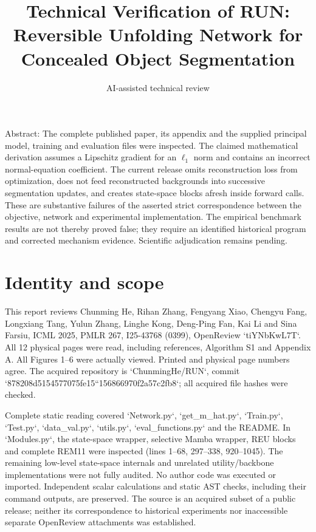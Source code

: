 \documentclass[10pt]{article}
\title{Technical Verification of RUN: Reversible Unfolding Network for Concealed Object Segmentation}
\author{AI-assisted technical review}
\date{}
\begin{document}
\maketitle
Abstract: The complete published paper, its appendix and the supplied principal model, training and evaluation files were inspected. The claimed mathematical derivation assumes a Lipschitz gradient for an \(\ell_1\) norm and contains an incorrect normal-equation coefficient. The current release omits reconstruction loss from optimization, does not feed reconstructed backgrounds into successive segmentation updates, and creates state-space blocks afresh inside forward calls. These are substantive failures of the asserted strict correspondence between the objective, network and experimental implementation. The empirical benchmark results are not thereby proved false; they require an identified historical program and corrected mechanism evidence. Scientific adjudication remains pending.\par
\section*{Identity and scope}
This report reviews Chunming He, Rihan Zhang, Fengyang Xiao, Chengyu Fang, Longxiang Tang, Yulun Zhang, Linghe Kong, Deng-Ping Fan, Kai Li and Sina Farsiu, ICML 2025, PMLR 267, I25-43768 (0399), OpenReview `tiYNbKwL7T`. All 12 physical pages were read, including references, Algorithm S1 and Appendix A. All Figures 1–6 were actually viewed. Printed and physical page numbers agree. The acquired repository is `ChunmingHe/RUN`, commit `878208d5154577075fe15``156866970f2a57c2fb8`; all acquired file hashes were checked.\par
Complete static reading covered `Network.py`, `get\_m\_hat.py`, `Train.py`, `Test.py`, `data\_val.py`, `utils.py`, `eval\_functions.py` and the README. In `Modules.py`, the state-space wrapper, selective Mamba wrapper, REU blocks and complete REM11 were inspected (lines 1–68, 297–338, 920–1045). The remaining low-level state-space internals and unrelated utility/backbone implementations were not fully audited. No author code was executed or imported. Independent scalar calculations and static AST checks, including their command outputs, are preserved. The source is an acquired subset of a public release; neither its correspondence to historical experiments nor inaccessible separate OpenReview attachments was established.\par
\end{document}
